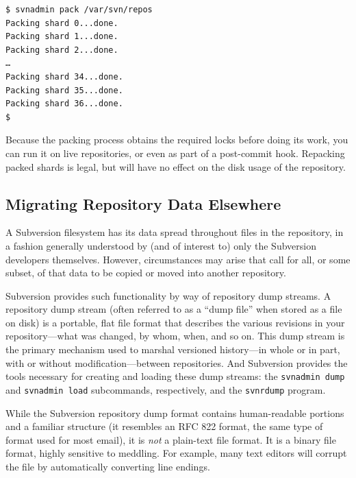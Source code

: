 \begin{verbatim}
$ svnadmin pack /var/svn/repos
Packing shard 0...done.
Packing shard 1...done.
Packing shard 2...done.
…
Packing shard 34...done.
Packing shard 35...done.
Packing shard 36...done.
$
\end{verbatim}

Because the packing process obtains the required locks before doing its
work, you can run it on live repositories, or even as part of a
post-commit hook. Repacking packed shards is legal, but will have no
effect on the disk usage of the repository.

\subsection{Migrating Repository Data
Elsewhere}\label{svn.reposadmin.maint.migrate}

A Subversion filesystem has its data spread throughout files in the
repository, in a fashion generally understood by (and of interest to)
only the Subversion developers themselves. However, circumstances may
arise that call for all, or some subset, of that data to be copied or
moved into another repository.

Subversion provides such functionality by way of repository dump
streams. A repository dump stream (often referred to as a ``dump file''
when stored as a file on disk) is a portable, flat file format that
describes the various revisions in your repository---what was changed,
by whom, when, and so on. This dump stream is the primary mechanism used
to marshal versioned history---in whole or in part, with or without
modification---between repositories. And Subversion provides the tools
necessary for creating and loading these dump streams: the
\texttt{svnadmin\ dump} and \texttt{svnadmin\ load} subcommands,
respectively, and the \texttt{svnrdump} program.

While the Subversion repository dump format contains human-readable
portions and a familiar structure (it resembles an RFC 822 format, the
same type of format used for most email), it is \emph{not} a plain-text
file format. It is a binary file format, highly sensitive to meddling.
For example, many text editors will corrupt the file by automatically
converting line endings.


